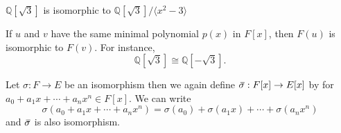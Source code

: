 \begin{example}
    $\mathbb{Q}[\sqrt{3}]$ is isomorphic to $\mathbb{Q}[\sqrt{3}]/\langle x^2 - 3 \rangle$
\end{example}

\begin{example}
    If $u$ and $v$ have the same minimal polynomial $p(x)$ in $F[x]$, then $F(u)$ is 
    isomorphic to $F(v)$. For instance,
    \[
        \mathbb{Q}[\sqrt{3}] \cong \mathbb{Q}[-\sqrt{3}].
    \]
\end{example}

Let $\sigma: F \to E$ be an isomorphism then we again define 
$\,\overline{\!{\sigma}} : F[x] \to E[x]$ by for $a_0 + a_1x + \cdots + a_n x^n \in F[x]$. We can write 
\begin{equation}
    \sigma (a_0 + a_1x + \cdots + a_n x^n) = \sigma(a_0) + \sigma(a_1x) + \cdots + \sigma(a_n x^n)
\end{equation}
and $\,\overline{\!{\sigma}}$ is also isomorphism.

